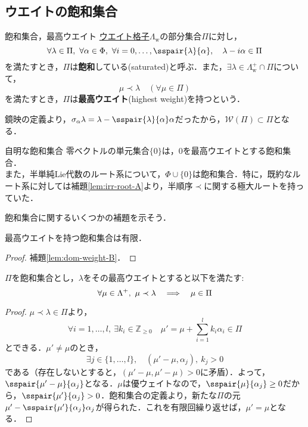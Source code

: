 \documentclass[rep_main]{subfiles}
\begin{document}
\subsection{ウエイトの飽和集合}
\begin{mydef}[label=def:weight-saturated]{飽和集合，最高ウエイト}
	\hyperref[def:root-lattice]{ウエイト格子}$\Lambda_\text{w}$の部分集合$\Pi$に対し，
	\begin{equation}
		\forall \lambda \in \Pi,\ \forall \alpha \in \Phi,\ \forall i = 0, \ldots, \sspair{\lambda}{\alpha},\quad  \lambda - i\alpha \in \Pi
	\end{equation}
	を満たすとき，$\Pi$は\textbf{飽和}している(saturated)と呼ぶ．また，$\exists \lambda \in \Lambda_\text{w}^+ \cap \Pi$について，
	\begin{equation}
		\mu \prec \lambda\quad  (\forall \mu \in \Pi)
	\end{equation}
	を満たすとき，$\Pi$は\textbf{最高ウエイト}(highest weight)を持つという．
\end{mydef}
鏡映の定義より，$\sigma_{\alpha}\lambda = \lambda - \sspair{\lambda}{\alpha}\alpha$だったから，$\mathscr{W}(\Pi) \subset \Pi$となる．
\begin{myexample}[label=ex:saturated-of-weights]{自明な飽和集合}
	零ベクトルの単元集合$\{0\}$は，$0$を最高ウエイトとする飽和集合．\\
	また，半単純Lie代数のルート系について，$\Phi \cup \{0\}$は飽和集合．特に，既約なルート系に対しては補題\ref{lem:irr-root-A}より，半順序$\prec$に関する極大ルートを持っていた．
\end{myexample}
飽和集合に関するいくつかの補題を示そう．
\begin{mylem}[label=lem:weight-saturated-A]{}
	最高ウエイトを持つ飽和集合は有限．
\end{mylem}
\begin{proof}
	補題\ref{lem:dom-weight-B}．
\end{proof}
\begin{mylem}[label=lem:weight-saturated-B]{}
	$\Pi$を飽和集合とし，$\lambda$をその最高ウエイトとすると以下を満たす:
	\begin{equation}
		\forall \mu \in \Lambda^+,\ \mu \prec \lambda  \quad \Longrightarrow \quad  \mu \in \Pi
	\end{equation}
\end{mylem}
\begin{proof}
	$\mu \prec \lambda \in \Pi$より，
	\begin{equation}
		\forall i = 1, \ldots, l,\ \exists k_i \in \mathbb{Z}_{\geq 0}\quad  \mu' = \mu + \sum_{i = 1}^l k_i\alpha_i \in \Pi
	\end{equation}
	とできる．$\mu' \neq \mu$のとき，
	\begin{equation}
		\exists j \in \{1, \ldots, l\},\quad  (\mu' - \mu,\alpha_j),\ k_j > 0
	\end{equation}
	である（存在しないとすると，$(\mu' - \mu, \mu' - \mu) > 0$に矛盾）．よって，$\sspair{\mu' - \mu}{\alpha_j}$となる．$\mu$は優ウェイトなので，$\sspair{\mu}{\alpha_j} \geq 0$だから，$\sspair{\mu'}{\alpha_j} > 0$．飽和集合の定義より，新たな$\Pi$の元$\mu' - \sspair{\mu'}{\alpha_j}\alpha_j$が得られた．これを有限回繰り返せば，$\mu' = \mu$となる．
\end{proof}
\end{document}
